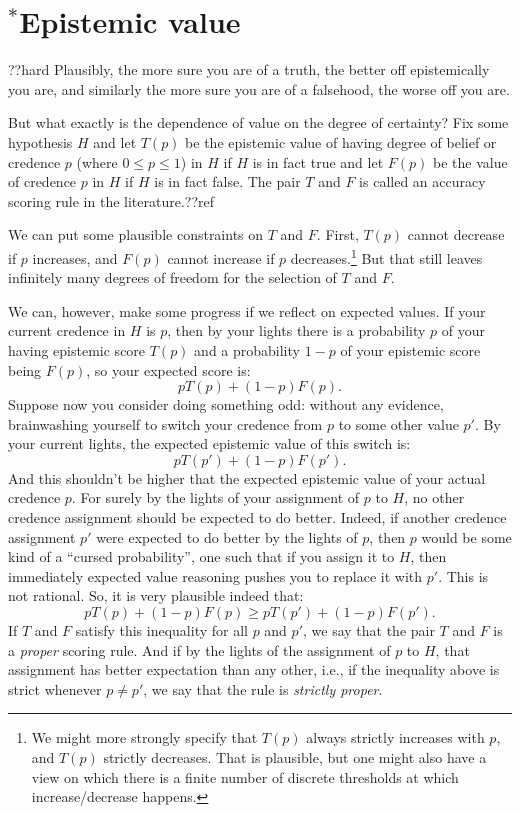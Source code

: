 \section{$^*$Epistemic value}??hard
Plausibly, the more sure you are of a truth, the better off epistemically you are, and similarly the more sure you are
of a falsehood, the worse off you are. 

But what exactly is the dependence of value on the degree of certainty? Fix some hypothesis $H$ and let $T(p)$ be the epistemic value of 
having degree of belief or credence $p$ (where $0\le p\le 1$) in $H$ if $H$ is in fact true and let $F(p)$ be the value of credence
$p$ in $H$ if $H$ is in fact false. The pair $T$ and $F$ is called an accuracy scoring rule in the literature.??ref 

We can put some plausible constraints on $T$ and $F$. First, $T(p)$ cannot decrease if $p$ increases,
and $F(p)$ cannot increase if $p$ decreases.\footnote{We might more strongly specify that $T(p)$ always strictly increases with $p$, and $T(p)$
strictly decreases. That is
plausible, but one might also have a view on which there is a finite number of discrete thresholds at which increase/decrease happens.}
But that still leaves infinitely many degrees of freedom for the selection of $T$ and $F$.

We can, however, make some progress if we reflect on expected values. If your current credence in $H$ is $p$, then by your lights
there is a probability $p$ of your having epistemic score $T(p)$ and a probability $1-p$ of your epistemic score being $F(p)$, so
your expected score is:
$$
    p T(p) + (1-p) F(p).
$$
Suppose now you consider doing something odd: without any evidence, brainwashing yourself to switch your credence from $p$ to some 
other value $p'$. By your current lights, the expected epistemic value of this switch is:
$$
    p T(p') + (1-p) F(p').
$$
And this shouldn't be higher that the expected epistemic value of your actual credence $p$. For surely by the lights of your
assignment of $p$ to $H$, no other credence assignment should be expected to do better. Indeed, if another credence assignment
$p'$ were expected to do better by the lights of $p$, then $p$ would be some kind of a ``cursed probability'', one such that
if you assign it to $H$, then immediately expected value reasoning pushes you to replace it with $p'$. This is not rational.
So, it is very plausible indeed that:
$$
    p T(p) + (1-p) F(p) \ge
    p T(p') + (1-p) F(p').
$$
If $T$ and $F$ satisfy this inequality for all $p$ and $p'$, we say that the pair $T$ and $F$ is a \textit{proper} scoring rule.
And if by the lights of the assignment of $p$ to $H$, that assignment has better expectation than any other, i.e., if the
inequality above is strict whenever $p\ne p'$, we say that the rule is \textit{strictly proper}.


